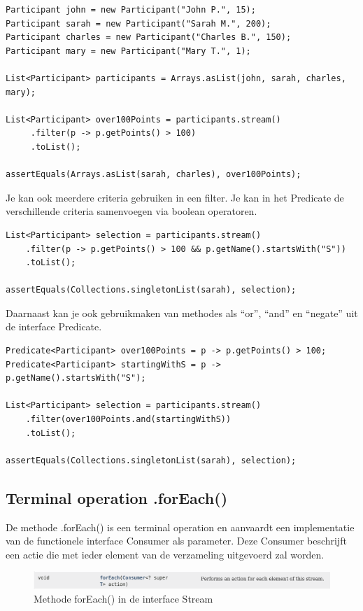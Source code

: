 \begin{lstlisting}
Participant john = new Participant("John P.", 15);
Participant sarah = new Participant("Sarah M.", 200);
Participant charles = new Participant("Charles B.", 150);
Participant mary = new Participant("Mary T.", 1);

List<Participant> participants = Arrays.asList(john, sarah, charles, mary);

List<Participant> over100Points = participants.stream()
     .filter(p -> p.getPoints() > 100)
     .toList();

assertEquals(Arrays.asList(sarah, charles), over100Points);
\end{lstlisting}

Je kan ook meerdere criteria gebruiken in een filter. Je kan in het Predicate de verschillende criteria samenvoegen via boolean operatoren.

\begin{lstlisting}
List<Participant> selection = participants.stream()
    .filter(p -> p.getPoints() > 100 && p.getName().startsWith("S"))
    .toList();
    
assertEquals(Collections.singletonList(sarah), selection);
\end{lstlisting}

Daarnaast kan je ook gebruikmaken van methodes als ``or'',  ``and'' en ``negate'' uit de interface Predicate.
		
\begin{lstlisting}
Predicate<Participant> over100Points = p -> p.getPoints() > 100;
Predicate<Participant> startingWithS = p -> p.getName().startsWith("S");

List<Participant> selection = participants.stream()
    .filter(over100Points.and(startingWithS))
    .toList();

assertEquals(Collections.singletonList(sarah), selection);
\end{lstlisting}

\subsection{Terminal operation .forEach()}

De methode .forEach() is een terminal operation en aanvaardt een implementatie van de functionele interface Consumer als parameter. Deze Consumer beschrijft een actie die met ieder element van de verzameling uitgevoerd zal worden.

\begin{figure}[H]
  \includegraphics[width=\linewidth]{images/h6/stream_forEach.png}
  \caption{Methode forEach() in de interface Stream}
  \label{fig:stream_foreach}
\end{figure}

